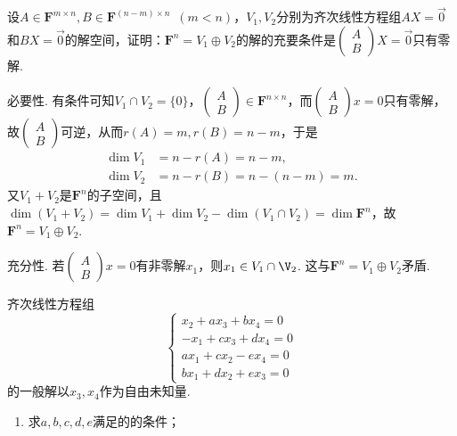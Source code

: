 \begin{exercise}
\begin{exgroup}
        \item 设$A \in \mathbf{F}^{m \times n},B \in \mathbf{F}^{(n-m) \times n}\enspace(m<n)$，$V_1,V_2$分别为齐次线性方程组$AX=\vec{0}$和$BX=\vec{0}$的解空间，证明：$\mathbf{F}^n=V_1\oplus V_2$的解的充要条件是$\begin{pmatrix} A \\ B \end{pmatrix}X=\vec{0}$只有零解.
        \begin{answer}
            必要性. 有条件可知$V_1\cap V_2=\{0\}$，$\begin{pmatrix}A\\B\end{pmatrix}\in\mathbf{F}^{n\times n}$，而$\begin{pmatrix}A\\B\end{pmatrix}x=0$只有零解，故$\begin{pmatrix}A\\B\end{pmatrix}$可逆，从而$r(A)=m,r(B)=n-m$，于是
          \begin{align*}
              \dim V_1 & =n-r(A)=n-m,       \\
              \dim V_2 & =n-r(B)=n-(n-m)=m.
          \end{align*}
          又$V_1+V_2$是$\mathbf{F}^n$的子空间，且$\dim(V_1+V_2)=\dim V_1+\dim V_2-\dim(V_1\cap V_2)=\dim\mathbf{F}^n$，故$\mathbf{F}^n=V_1\oplus V_2$.

          充分性. 若$\begin{pmatrix}A\\B\end{pmatrix}x=0$有非零解$x_1$，则$x_1\in V_1\cap\V_2$. 这与$\mathbf{F}^n=V_1\oplus V_2$矛盾.
        \end{answer}

        \item 齐次线性方程组\[\begin{cases}
                x_2+ax_3+bx_4=0  \\
                -x_1+cx_3+dx_4=0 \\
                ax_1+cx_2-ex_4=0 \\
                bx_1+dx_2+ex_3=0
            \end{cases}\]的一般解以$x_3,x_4$作为自由未知量.
        \begin{enumerate}
            \item 求$a,b,c,d,e$满足的的条件；


\end{enumerate}
\end{exgroup}
\end{exercise}
